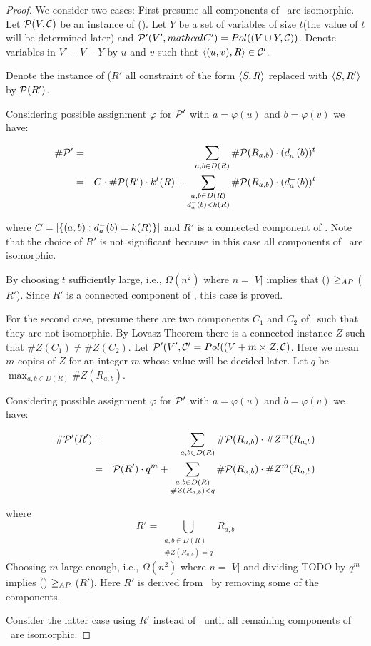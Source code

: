 \begin{proof}
We consider two cases: First presume all components of \mR\ are isomorphic.
Let \(\mathcal{P}(V,\mathcal{C})\) be an instance of \ccsp(\mR)\@.
Let \(Y\) be a set of variables of size \(t\)(the value of \(t\) will be determined later) 
and \(\mathcal{P}'(V', mathcal{C}') = Pol((V \cup Y , \mathcal{C}))\).
Denote variables in \(V' - V - Y\) by \(u\) and \(v\) such that \(\langle (u,v),R \rangle\in \mathcal{C}'\)\@.

Denote the instance of \ccsp(\(R'\) all constraint of the form \(\langle S,R \rangle\)
replaced with \(\langle S,R' \rangle\) by \(\mathcal{P}(R')\)\@.

Considering possible assignment \(\varphi\) for \(\mathcal{P}'\) with
\(a = \varphi(u)\) and \(b = \varphi(v)\) we have:

\begin{eqnarray*}
\#\mathcal{P}' &=& \sum_{a,b\in D(R)} \#\mathcal{P}(R_{a,b}) \cdot (d^-_a(b))^t \\
&=&C \cdot\#\mathcal{P}(R') \cdot k^t(R) + 
\sum_{\substack{a,b\in D(R)\\ d^-_a(b) < k(R)}} 
\#\mathcal{P}(R_{a,b}) \cdot (d^-_a(b))^t
\end{eqnarray*}


where \(C = |\{{(a,b): d^-_a(b)=k(R)}\}|\) and \(R'\) is a
connected component of \mR\@. Note that the choice of \(R'\) is not significant 
because in this case all components of \mR\ are isomorphic.

By choosing \(t\) sufficiently large, i.e., \(\Omega(n^2)\) where \(n=|V|\) implies
that \ccsp(\mR) \(\ge_{AP}\) \ccsp(\(R'\))\@. 
Since \(R'\) is a connected component of \mR, this case is proved.

For the second case, presume there are two components \(C_1\) and \(C_2\) of
\mR\ such that they are not isomorphic. By Lovasz Theorem there
is a connected instance \(Z\) such that \(\#Z(C_1) \neq \#Z(C_2)\)\@. 
Let \(\mathcal{P}'(V',\mathcal{C}' = Pol((V+m \times Z, \mathcal{C})\). Here we mean 
\(m\) copies of \(Z\) for an integer \(m\) whose value will be
decided later. Let \(q\) be \(\max_{a,b \in D(R)} \#Z(R_{a,b})\).

Considering possible assignment \(\varphi\) for \(\mathcal{P}'\) with
\(a = \varphi(u)\) and \(b = \varphi(v)\) we have:


\begin{eqnarray*}
\#\mathcal{P}'(R')&=&\sum_{a,b\in D(R)} \#\mathcal{P}(R_{a,b}) 
\cdot \#Z^m(R_{a,b}) \\
&=&\mathcal{P}(R') \cdot q^m + 
\sum_{\substack{a,b\in D(R)\\ \#Z(R_{a,b}) < q}} 
\#\mathcal{P}(R_{a,b}) \cdot \#Z^m(R_{a,b})
\end{eqnarray*}

where \[
R'=\bigcup_{\substack{a,b\in D(R) \\ 
\#Z(R_{a,b})=q}} R_{a,b}\]
Choosing \(m\) large enough, i.e., \(\Omega(n^2)\) where \(n=|V|\) 
and dividing TODO by \(q^m\) implies \ccsp(\mR) \(\ge_{AP}\) \ccsp(\(R'\)). 
Here \(R'\) is derived from \mR\ by removing some of the components. 

Consider the latter case using \(R'\) instead of \mR\
until all remaining components of \mR\ are isomorphic.
\end{proof}


